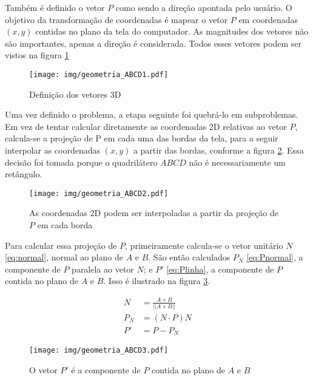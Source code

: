 \documentclass[brazil,pagestart=firstchapter]{abnt}
\begin{document}
Também é definido o vetor $P$ como sendo a direção apontada pelo usuário. O
objetivo da transformação de coordenadas é mapear o vetor $P$ em coordenadas
$(x, y)$ contidas no plano da tela do computador. As magnitudes dos vetores
não são importantes, apenas a direção é considerada. Todos esses vetores
podem ser vistos na figura \ref{fig:geometria_ABCD1}

\begin{figure}[h]
\centering
\texttt{[image: img/geometria\_ABCD1.pdf]}
\caption{Definição dos vetores 3D}
\label{fig:geometria_ABCD1}
\end{figure}

Uma vez definido o problema, a etapa seguinte foi quebrá-lo em subproblemas.
Em vez de tentar calcular diretamente as coordenadas 2D relativas ao vetor
$P$, calcula-se a projeção de P em cada uma das bordas da tela, para a
seguir interpolar as coordenadas $(x, y)$ a partir das bordas, conforme a
figura \ref{fig:geometria_ABCD2}. Essa decisão foi tomada porque o
quadrilátero $ABCD$ não é necessariamente um retângulo.

\begin{figure}[h]
\centering
\texttt{[image: img/geometria\_ABCD2.pdf]}
\caption{As coordenadas 2D podem ser interpoladas a partir da projeção de
$P$ em cada borda}
\label{fig:geometria_ABCD2}
\end{figure}

Para calcular essa projeção de $P$, primeiramente calcula-se o vetor
unitário $N$ \eqref{eq:normal}, normal ao plano de $A$ e $B$. São então
calculados $P_N$ \eqref{eq:Pnormal}, a componente de $P$ paralela ao vetor
$N$; e $P'$ \eqref{eq:Plinha}, a componente de $P$ contida no plano de $A$ e
$B$. Isso é ilustrado na figura \ref{fig:geometria_ABCD3}.

\begin{align}
\label{eq:normal}
N   & = \frac{A \times B}{ || A \times B || }   \\
\label{eq:Pnormal}
P_N & = (N \cdot P) N                           \\
\label{eq:Plinha}
P'  & = P - P_N
\end{align}

\begin{figure}[h]
\centering
\texttt{[image: img/geometria\_ABCD3.pdf]}
\caption{O vetor $P'$ é a componente de $P$ contida no plano de $A$ e $B$}
\label{fig:geometria_ABCD3}
\end{figure}
\end{document}

